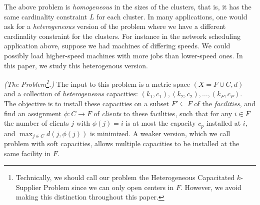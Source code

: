 The above problem is {\em homogeneous} in the sizes of the clusters, that is, it has the same cardinality constraint $L$ for each cluster. In many applications, one would ask for a \emph{heterogeneous} version of the problem where we have a different cardinality constraint for the clusters.
For instance in the network scheduling application above, suppose we had machines of differing speeds. We could possibly load higher-speed machines with more jobs than lower-speed ones. In this paper, we study  this heterogenous version.

\begin{definition}\emph{(The \mckc Problem\footnote{Technically, we should call our problem the Heterogeneous Capacitated $k$-Supplier Problem since we can only open centers in $F$. However, we avoid making this distinction throughout this paper.}.)}
	The input to this problem is a metric space $(X = F\cup C,d)$  %
	and  a collection of {\em heterogeneous} capacities: $(k_1,c_1), (k_2,c_2),\ldots, (k_P,c_P)$.
	The objective is to install these capacities on a subset $F'\subseteq F$ of the {\em facilities}, and find an assignment $\phi:C\to F$ of {\em clients} to these facilities,
	such that for any $i\in F$ the number of clients $j$ with $\phi(j) = i$ is at most the capacity $c_p$ installed at $i$, and $\max_{j\in C} d(j,\phi(j))$ is minimized.
	A weaker version, which we call \mckc problem with soft capacities, allows multiple capacities to be installed at the same facility in $F$.
\end{definition}
